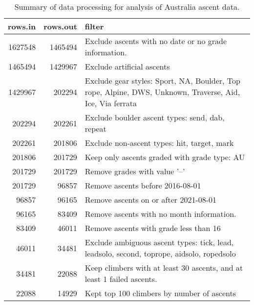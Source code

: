 \begin{table}[ht]
\centering
\begingroup\fontsize{9pt}{10pt}\selectfont
\begin{tabular}{rrl}
  \hline
{\bf rows.in} & {\bf rows.out} & {\bf filter} \\ 
  \hline
1627548 & 1465494 & Exclude ascents with no date or no grade information. \\ 
  1465494 & 1429967 & Exclude artificial ascents \\ 
  1429967 & 202294 & Exclude gear styles: Sport, NA, Boulder, Top rope, Alpine, DWS, Unknown, Traverse, Aid, Ice, Via ferrata \\ 
  202294 & 202261 & Exclude boulder ascent types: send, dab, repeat \\ 
  202261 & 201806 & Exclude non-ascent types: hit, target, mark \\ 
  201806 & 201729 & Keep only ascents graded with grade type: AU \\ 
  201729 & 201729 & Remove grades with value '--' \\ 
  201729 & 96857 & Remove ascents before 2016-08-01 \\ 
  96857 & 96165 & Remove ascents on or after 2021-08-01 \\ 
  96165 & 83409 & Remove ascents with no month information. \\ 
  83409 & 46011 & Remove ascents with grade less than 16 \\ 
  46011 & 34481 & Exclude ambiguous ascent types: tick, lead, leadsolo, second, toprope, aidsolo, ropedsolo \\ 
  34481 & 22088 & Keep climbers with at least 30 ascents, and at least 1 failed ascents. \\ 
  22088 & 14929 & Kept top 100 climbers by number of ascents \\ 
   \hline
\end{tabular}
\endgroup
\caption{Summary of data processing for analysis of Australia ascent data.} 
\label{table-data-processing-aus}
\end{table}
